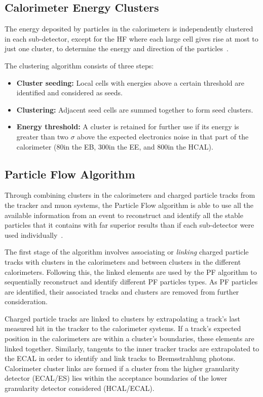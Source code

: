 \subsection{Calorimeter Energy Clusters}\label{subsec:clustering}
The energy deposited by particles in the calorimeters is independently clustered in each sub-detector, except for the HF where each large cell gives rise at most to just one cluster, to determine the energy and direction of the particles~\cite{CMS:2009nxa}.

The clustering algorithm consists of three steps:
\begin{itemize}
\item \textbf{Cluster seeding:} Local cells with energies above a certain threshold are identified and considered as seeds.
\item \textbf{Clustering:} Adjacent seed cells are summed together to form seed clusters.
\item \textbf{Energy threshold:} A cluster is retained for further use if its energy is greater than two $\sigma$ above the expected electronics noise in that part of the calorimeter (80\MeV in the EB, 300\MeV in the EE, and 800\MeV in the HCAL).
\end{itemize}

\subsection{Particle Flow Algorithm}\label{subsec:PF}
Through combining clusters in the calorimeters and charged particle tracks from the tracker and muon systems, the Particle Flow algorithm is able to use all the available information from an event to reconstruct and identify all the stable particles that it contains with far superior results than if each sub-detector were used individually~\cite{CMS-PRF-14-001}.

The first stage of the algorithm involves associating or \emph{linking} charged particle tracks with clusters in the calorimeters and between clusters in the different calorimeters.
Following this, the linked elements are used by the PF algorithm to sequentially reconstruct and identify different PF particles types.
As PF particles are identified, their associated tracks and clusters are removed from further consideration.

Charged particle tracks are linked to clusters by extrapolating a track's last measured hit in the tracker to the calorimeter systems.
If a track's expected position in the calorimeters are within a cluster's boundaries, these elements are linked together.
Similarly, tangents to the inner tracker tracks are extrapolated to the ECAL in order to identify  and link tracks to Bremsstrahlung photons.
Calorimeter cluster links are formed if a cluster from the higher granularity detector (ECAL/ES) lies within the acceptance boundaries of the lower granularity detector considered (HCAL/ECAL).

